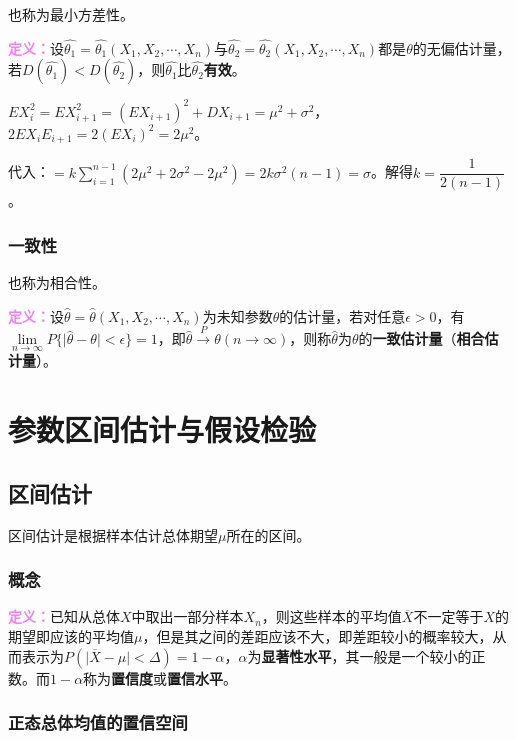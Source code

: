\documentclass[UTF8, 12pt]{ctexart}
\begin{document}
也称为最小方差性。

\textcolor{violet}{\textbf{定义：}}设$\hat{\theta_1}=\hat{\theta_1}(X_1,X_2,\cdots,X_n)$与$\hat{\theta_2}=\hat{\theta_2}(X_1,X_2,\cdots,X_n)$都是$\theta$的无偏估计量，若$D(\hat{\theta_1})<D(\hat{\theta_2})$，则$\hat{\theta_1}$比$\hat{\theta_2}$\textbf{有效}。

$EX_i^2=EX_{i+1}^2=(EX_{i+1})^2+DX_{i+1}=\mu^2+\sigma^2$，$2EX_iE_{i+1}=2(EX_i)^2=2\mu^2$。

代入：$=k\sum\limits_{i=1}^{n-1}(2\mu^2+2\sigma^2-2\mu^2)=2k\sigma^2(n-1)=\sigma$。解得$k=\dfrac{1}{2(n-1)}$。

\subsubsection{一致性}

也称为相合性。

\textcolor{violet}{\textbf{定义：}}设$\hat{\theta}=\hat{\theta}(X_1,X_2,\cdots,X_n)$为未知参数$\theta$的估计量，若对任意$\epsilon>0$，有$\lim\limits_{n\to\infty}P\{\vert\hat{\theta}-\theta\vert<\epsilon\}=1$，即$\hat{\theta}\overset{P}{\longrightarrow}\theta(n\to\infty)$，则称$\hat{\theta}$为$\theta$的\textbf{一致估计量}（\textbf{相合估计量}）。

\section{参数区间估计与假设检验}

\subsection{区间估计}

区间估计是根据样本估计总体期望$\mu$所在的区间。

\subsubsection{概念}

\textcolor{violet}{\textbf{定义：}}已知从总体$X$中取出一部分样本$X_n$，则这些样本的平均值$\overline{X}$不一定等于$X$的期望即应该的平均值$\mu$，但是其之间的差距应该不大，即差距较小的概率较大，从而表示为$P(\vert\overline{X}-\mu\vert<\Delta)=1-\alpha$，$\alpha$为\textbf{显著性水平}，其一般是一个较小的正数。而$1-\alpha$称为\textbf{置信度}或\textbf{置信水平}。

\subsubsection{正态总体均值的置信空间}
\end{document}

